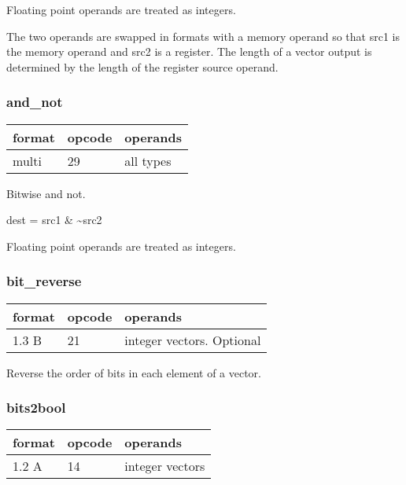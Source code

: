 \documentclass[forwardcom.tex]{subfiles}
\begin{document}
\vspace{2mm}
Floating point operands are treated as integers.

\vspace{2mm}
The two operands are swapped in formats with a memory operand so that src1 is the memory operand and src2 is a register. The length of a vector output is determined by the length of the register source operand.

\subsubsection{and\_not}
\label{table:andNotInstruction}
\begin{tabular}{|p{12mm}|p{12mm}|p{110mm}|}
\hline
\bfseries format & \bfseries opcode & \bfseries operands \\ \hline
multi & 29 & all types \\ \hline
\end{tabular}
\vspace{2mm}

Bitwise and not.

dest = src1 \& \~{}src2
\vspace{2mm}

Floating point operands are treated as integers.

\subsubsection{bit\_reverse}
\label{table:bitReverseInstruction}
\begin{tabular}{|p{12mm}|p{12mm}|p{110mm}|}
\hline
\bfseries format & \bfseries opcode & \bfseries operands \\ \hline
1.3 B & 21 & integer vectors. Optional \\ \hline
\end{tabular}
\vspace{2mm}

Reverse the order of bits in each element of a vector.

\subsubsection{bits2bool}
\label{table:bits2boolInstruction}
\begin{tabular}{|p{12mm}|p{12mm}|p{110mm}|}
\hline
\bfseries format & \bfseries opcode & \bfseries operands \\ \hline
1.2 A & 14 & integer vectors \\ \hline
\end{tabular}
\vspace{2mm}
\end{document}
